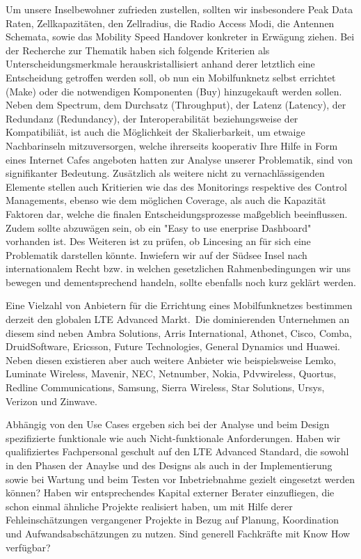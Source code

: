 	Um unsere Inselbewohner zufrieden zustellen, sollten wir insbesondere Peak Data Raten, Zellkapazitäten, den Zellradius, die Radio Access Modi, die Antennen Schemata, sowie das Mobility Speed Handover konkreter in Erwägung ziehen\cite{Dat14}.
	Bei der Recherche zur Thematik haben sich folgende Kriterien als Unterscheidungsmerkmale herauskristallisiert anhand derer letztlich eine Entscheidung getroffen werden soll, ob nun ein Mobilfunknetz selbst errichtet (Make) oder die notwendigen Komponenten (Buy) hinzugekauft werden sollen. Neben dem Spectrum, dem Durchsatz (Throughput), der Latenz (Latency),  der Redundanz (Redundancy), der Interoperabilität beziehungsweise der Kompatibiliät, ist auch die Möglichkeit der Skalierbarkeit, um etwaige Nachbarinseln mitzuversorgen, welche ihrerseits kooperativ Ihre Hilfe in Form eines Internet Cafes angeboten hatten zur Analyse unserer Problematik, sind von signifikanter Bedeutung. Zusätzlich  als weitere nicht zu vernachlässigenden Elemente stellen auch Kritierien wie das des Monitorings respektive des Control Managements, ebenso wie dem möglichen Coverage, als auch die Kapazität  Faktoren dar, welche die finalen Entscheidungsprozesse maßgeblich beeinflussen. Zudem sollte abzuwägen sein, ob ein "Easy to use enerprise Dashboard" vorhanden ist. Des Weiteren ist zu prüfen, ob Lincesing an für sich eine Problematik darstellen könnte. Inwiefern wir auf der Südsee Insel nach internationalem Recht bzw. in welchen gesetzlichen Rahmenbedingungen wir uns bewegen und dementsprechend handeln, sollte ebenfalls noch kurz geklärt werden.
	
	Eine Vielzahl von Anbietern für die Errichtung eines Mobilfunknetzes bestimmen derzeit den globalen LTE Advanced Markt.\ Die dominierenden Unternehmen an diesem sind neben Ambra Solutions, Arris International,
	Athonet, Cisco, Comba, DruidSoftware, Ericsson, Future Technologies, General Dynamics und 
	Huawei. Neben diesen existieren aber auch weitere Anbieter wie beispielsweise Lemko, Luminate Wireless,
	Mavenir,
	NEC,
	Netnumber,
	Nokia,
	Pdvwireless,
	Quortus,
	Redline Communications,
	Samsung,
	Sierra Wireless,
	Star Solutions,
	Ursys,
	Verizon und 
	Zinwave.\cite{Max19}
	
	Abhängig von den Use Cases ergeben sich bei der Analyse und beim Design spezifizierte funktionale wie auch Nicht-funktionale Anforderungen. Haben wir qualifiziertes Fachpersonal geschult auf den LTE Advanced Standard, die sowohl in den Phasen der Anaylse und des Designs als auch in der Implementierung sowie bei Wartung und beim Testen vor Inbetriebnahme gezielt eingesetzt werden können? Haben wir entsprechendes Kapital externer Berater einzufliegen, die schon einmal ähnliche Projekte realisiert haben, um mit Hilfe derer Fehleinschätzungen vergangener Projekte in Bezug auf Planung, Koordination und Aufwandsabschätzungen zu nutzen. Sind generell Fachkräfte mit Know How verfügbar?
